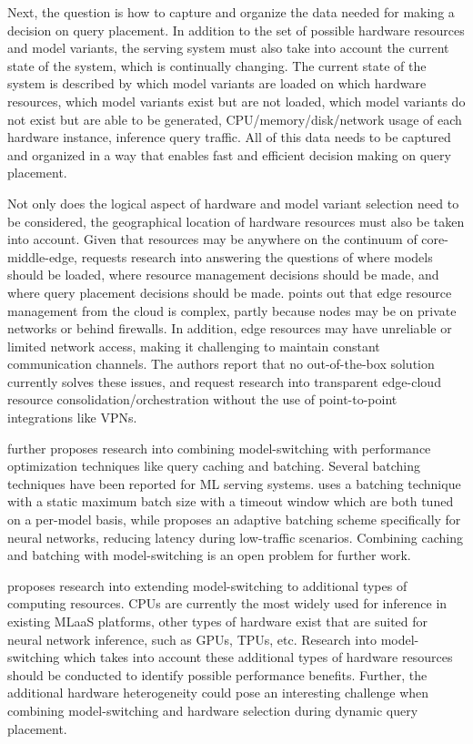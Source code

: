 Next, the question is how to capture and organize the data needed for making a decision on query placement.
In addition to the set of possible hardware resources and model variants, the serving system must also take into account the current state of the system, which is continually changing.
The current state of the system is described by which model variants are loaded on which hardware resources, which model variants exist but are not loaded, which model variants do not exist but are able to be generated, CPU/memory/disk/network usage of each hardware instance, inference query traffic.
All of this data needs to be captured and organized in a way that enables fast and efficient decision making on query placement.

Not only does the logical aspect of hardware and model variant selection need to be considered, the geographical location of hardware resources must also be taken into account.
Given that resources may be anywhere on the continuum of core-middle-edge, \cite{Yadwadkar2019} requests research into answering the questions of where models should be loaded, where resource management decisions should be made, and where query placement decisions should be made.
\cite{Rausch2019a} points out that edge resource management from the cloud is complex, partly because nodes may be on private networks or behind firewalls.
In addition, edge resources may have unreliable or limited network access, making it challenging to maintain constant communication channels.
The authors report that no out-of-the-box solution currently solves these issues, and request research into transparent edge-cloud resource consolidation/orchestration without the use of point-to-point integrations like VPNs.

\cite{Zhang2020} further proposes research into combining model-switching with performance optimization techniques like query caching and batching.
Several batching techniques have been reported for ML serving systems.
\cite{Crankshaw2017} uses a batching technique with a static maximum batch size with a timeout window which are both tuned on a per-model basis, while \cite{Choi2021} proposes an adaptive batching scheme specifically for neural networks, reducing latency during low-traffic scenarios.
Combining caching and batching with model-switching is an open problem for further work.

\cite{Zhang2020} proposes research into extending model-switching to additional types of computing resources.
CPUs are currently the most widely used for inference in existing MLaaS platforms, other types of hardware exist that are suited for neural network inference, such as GPUs, TPUs, etc.
Research into model-switching which takes into account these additional types of hardware resources should be conducted to identify possible performance benefits.
Further, the additional hardware heterogeneity could pose an interesting challenge when combining model-switching and hardware selection during dynamic query placement.

